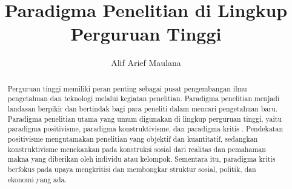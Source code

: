 \documentclass[10pt, a4paper]{article}
\begin{document}
\title{\textbf{Paradigma Penelitian di Lingkup Perguruan Tinggi}}
\author{Alif Arief Maulana}

\maketitle


\begin{abstract}
    Perguruan tinggi memiliki peran penting sebagai pusat pengembangan ilmu pengetahuan dan teknologi melalui kegiatan penelitian. Paradigma penelitian menjadi landasan berpikir dan bertindak bagi para peneliti dalam mencari pengetahuan baru. Paradigma penelitian utama yang umum digunakan di lingkup perguruan tinggi, yaitu paradigma positivisme, paradigma konstruktivisme, dan paradigma kritis \cite{creswell2014research, guba1994competing, smith1983quantitative}. Pendekatan positivisme mengutamakan penelitian yang objektif dan kuantitatif, sedangkan konstruktivisme menekankan pada konstruksi sosial dari realitas dan pemahaman makna yang diberikan oleh individu atau kelompok. Sementara itu, paradigma kritis berfokus pada upaya mengkritisi dan membongkar struktur sosial, politik, dan ekonomi yang ada.

\end{abstract}







\printbibliography
\end{document}
